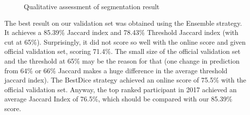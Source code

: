 \documentclass{article}
\begin{document}
\begin{figure}
\centering
{}\hfil
{}
\caption{Qualitative assessment of segmentation result}\label{result_samples}
\end{figure}

The best result on our validation set was obtained using the Ensemble strategy.  It achieves a 85.39\% Jaccard index and 78.43\% Threshold Jaccard index (with cut at 65\%). Surprisingly, it did not score so well with the online score and given official validation set, scoring 71.4\%.  The small size of the official validation set and the threshold at 65\% may be the reason for that (one change in prediction from 64\% or 66\% Jaccard makes a huge difference in the average threshold jaccard index). The BestDice strategy achieved an online score of 75.5\% with the official validation set.   Anyway, the top ranked participant in 2017 achieved an average Jaccard Index of 76.5\%, which should be compared with our 85.39\% score.
\end{document}
